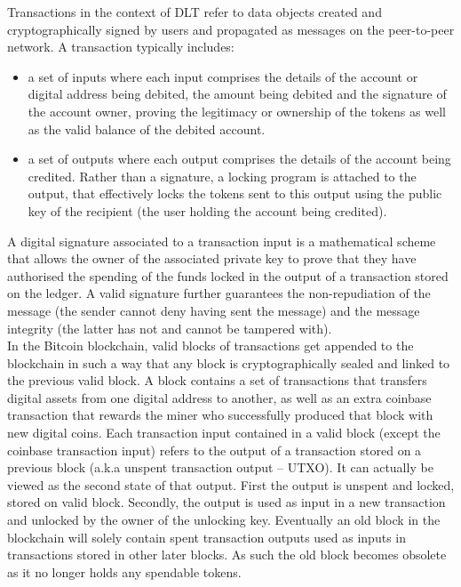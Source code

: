 Transactions in the context of DLT refer to data objects created and cryptographically signed by users and propagated as messages on the peer-to-peer network. A transaction typically includes:

\begin{itemize}
\item a set of inputs where each input comprises the details of the account or digital address being debited, the amount being debited and the signature of the account owner, proving the legitimacy or ownership of the tokens as well as the valid balance of the debited account. 
\item a set of outputs where each output comprises the details of the account being credited. Rather than a signature, a locking program is attached to the output, that effectively locks the tokens sent to this output using the public key of the recipient (the user holding the account being credited).
\end{itemize}

A digital signature associated to a transaction input is a mathematical scheme that allows the owner of the associated private key to prove that they have authorised the spending of the funds locked in the output of a transaction stored on the ledger. A valid signature further guarantees the non-repudiation of the message (the sender cannot deny having sent the message) and the message integrity (the latter has not and cannot be tampered with). \\

In the Bitcoin blockchain, valid blocks of transactions get appended to the blockchain in such a way that any block is cryptographically sealed and linked to the previous valid block. A block contains a set of transactions that transfers digital assets from one digital address to another, as well as an extra coinbase transaction that rewards the miner who successfully produced that block with new digital coins. Each transaction input contained in a valid block (except the coinbase transaction input) refers to the output of a transaction stored on a previous block (a.k.a unspent transaction output – UTXO).  It can actually be viewed as the second state of that output. First the output is unspent and locked, stored on valid block. Secondly, the output is used as input in a new transaction and unlocked by the owner of the unlocking key. Eventually an old block in the blockchain will solely contain spent transaction outputs used as inputs in transactions stored in other later blocks. As such the old block becomes obsolete as it no longer holds any spendable tokens. \\

